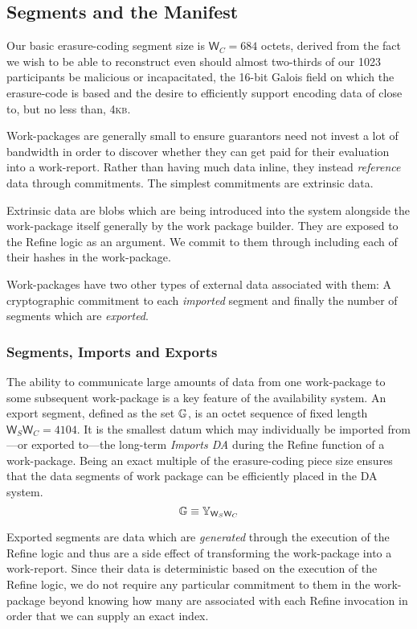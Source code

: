 \subsection{Segments and the Manifest}

Our basic erasure-coding segment size is $\mathsf{W}_C = 684$ octets, derived from the fact we wish to be able to reconstruct even should almost two-thirds of our 1023 participants be malicious or incapacitated, the 16-bit Galois field on which the erasure-code is based and the desire to efficiently support encoding data of close to, but no less than, 4\textsc{kb}.

Work-packages are generally small to ensure guarantors need not invest a lot of bandwidth in order to discover whether they can get paid for their evaluation into a work-report. Rather than having much data inline, they instead \emph{reference} data through commitments. The simplest commitments are extrinsic data.

Extrinsic data are blobs which are being introduced into the system alongside the work-package itself generally by the work package builder. They are exposed to the Refine logic as an argument. We commit to them through including each of their hashes in the work-package.

Work-packages have two other types of external data associated with them: A cryptographic commitment to each \emph{imported} segment and finally the number of segments which are \emph{exported}.

\subsubsection{Segments, Imports and Exports}

The ability to communicate large amounts of data from one work-package to some subsequent work-package is a key feature of the \Jam availability system. An export segment, defined as the set $\mathbb{G}$, is an octet sequence of fixed length $\mathsf{W}_S\mathsf{W}_C = 4104$. It is the smallest datum which may individually be imported from---or exported to---the long-term \emph{Imports DA} during the Refine function of a work-package. Being an exact multiple of the erasure-coding piece size ensures that the data segments of work package can be efficiently placed in the DA system.
\begin{equation}\label{eq:segment}
  \mathbb{G} \equiv \mathbb{Y}_{\mathsf{W}_S\mathsf{W}_C}
\end{equation}

Exported segments are data which are \emph{generated} through the execution of the Refine logic and thus are a side effect of transforming the work-package into a work-report. Since their data is deterministic based on the execution of the Refine logic, we do not require any particular commitment to them in the work-package beyond knowing how many are associated with each Refine invocation in order that we can supply an exact index.


